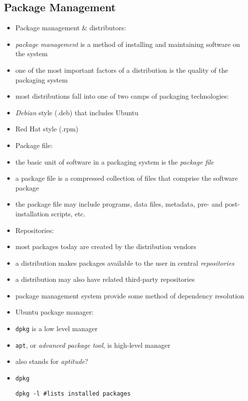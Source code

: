 \documentclass[twocolumn]{IEEEtran} %
\begin{document}
\subsection{Package Management}
\begin{itemize}
    \item Package management \& distributors:
    \bi
        \item \emph{package management} is a method of installing and maintaining software on the system
        \item one of the most important factors of a distribution is the quality of the packaging system
        \item most distributions fall into one of two camps of packaging technologies:
        \bi
            \item \emph{Debian} style (.deb) that includes Ubuntu
            \item Red Hat style (.rpm)
        \ei
    \ei
    \item Package file:
    \bi
       \item the basic unit of software in a packaging system is the \emph{package file}
       \item a package file is a compressed collection of files that comprise the software package
       \item the package file may include programs, data files, metadata, pre- and post-installation scripts, etc.
    \ei
    \item Repositories:
    \bi
        \item most packages today are created by the distribution vendors
        \item a distribution makes packages available to the user in central \emph{repositories}
        \item a distribution may also have related third-party repositories
        \item package management system provide some method of dependency resolution
    \ei
    \item Ubuntu package manager:
    \bi
        \item \verb|dpkg| is a low level manager
        \item \verb|apt|, or \emph{advanced package tool}, is high-level manager
        \bi
            \item also stands for \emph{aptitude}?
        \ei
    \ei
    \item \verb|dpkg|
    \begin{verbatim}
dpkg -l #lists installed packages

\end{verbatim}
\end{itemize}
\end{document}
